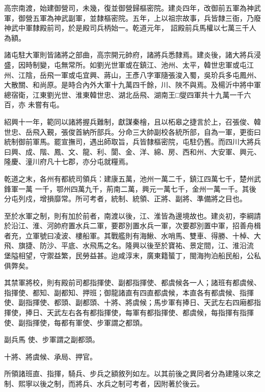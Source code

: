\begin{pinyinscope}
 高宗南渡，始建御營司，未幾，復並御營歸樞密院。建炎四年，改御前五軍為神武軍，御營五軍為神武副軍，並隸樞密院。五年，上以祖宗故事，兵皆隸三衙，乃廢神武中軍隸殿前司，於是殿司兵柄始一。乾道元年，
 詔殿前兵馬權以七萬三千人為額。



 諸屯駐大軍則皆諸將之部曲，高宗開元帥府，諸將兵悉隸焉。建炎後，諸大將兵浸盛，因時制變，屯無常所。如劉光世軍或在鎮江、池州、太平，韓世忠軍或屯江州、江陰，岳飛一軍或屯宜興、蔣山，王彥八字軍隨張浚入蜀，吳玠兵多屯鳳州、大散關、和尚原。是時合內外大軍十九萬四千餘，川、陜不與焉。及楊沂中將中軍總宿衛，江東劉光世、淮東韓世忠、湖北岳飛、湖南王□燮四軍共十九萬一千六百，亦
 未嘗有屯。



 紹興十一年，範同以諸將握兵難制，獻謀秦檜，且以柘皋之捷言於上，召張俊、韓世忠、岳飛入覲，張俊首納所部兵。分命三大帥副校各統所部，自為一軍，更銜曰統制御前軍馬。罷宣撫司，遇出師取旨，兵皆隸樞密院，屯駐仍舊。而四川大將兵曰興、成、階、鳳、文、龍、利、閬、金、洋、綿、房、西和州、大安軍、興元、隆慶、潼川府凡十七郡，亦分屯就糧焉。



 乾道之末，各州有都統司領兵：建康五萬，池州一萬二千，鎮江四萬七千，楚州武鋒軍一萬
 一千，鄂州四萬九千，荊南二萬，興元一萬七千，金州一萬一千。其後分屯列戍，增損靡常。所可考者，統制、統領、正將、副將、準備將之目也。



 至於水軍之制，則有加於前者，南渡以後，江、淮皆為邊境故也。建炎初，李綱請於沿江、淮、河帥府置水兵二軍，要郡別置水兵一軍，次要郡別置中軍，招善舟楫者充，立軍號曰凌波、樓船軍。其戰艦則有海鰍、水哨馬、雙車、得勝、十棹、大飛、旗捷、防沙、平底、水飛馬之名。隆興以後至於寶祐、景定間，江、淮沿流
 堡隘相望，守禦益繁，民勞益甚。迨咸淳末，廣東籍蜑丁，閩海拘泊船民船，公私俱弊矣。



 其禁軍將校，則有殿前司都指揮使、副都指揮使、都虞候各一人；諸班有都虞候、指揮使、都知、副都知、押班；御龍諸直有四直都虞候，本直各有都虞候、指揮使、副指揮使、都頭、副都頭、十將、將虞候；馬步軍有捧日、天武左右四廂都指揮使，捧日、天武左右各有都指揮使，每軍有都指揮使、都虞候，每指揮有指揮使、副指揮使，每都有軍使、步軍謂之都頭。



 副兵馬
 使、步軍謂之副都頭。



 十將、將虞候、承局、押官。



 所領諸班直、指揮，騎兵、步兵之額敘列如左。以其前後之異同者分為建隆以來之制、熙寧以後之制，而將兵、水兵之制可考者，因附著於後云。




\end{pinyinscope}
